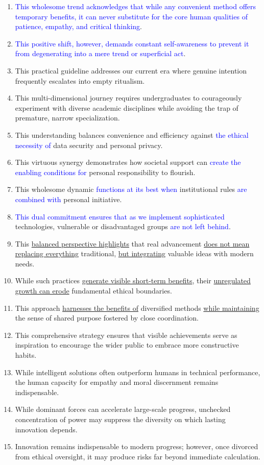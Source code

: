 \begin{enumerate}
    \item \textcolor{blue}{This wholesome trend acknowledges that while any convenient method offers temporary benefits, it can never substitute for the core human qualities of patience, empathy, and critical thinking}.
    \item \textcolor{blue}{This positive shift, however, demands constant self-awareness to prevent it from degenerating into a mere trend or superficial act}.
    \item This practical guideline addresses our current era where genuine intention frequently escalates into empty ritualism.
    \item This multi-dimensional journey requires undergraduates to courageously experiment with diverse academic disciplines while avoiding the trap of premature, narrow specialization.
    \item This understanding balances convenience and efficiency against \textcolor{blue}{the ethical necessity of} data security and personal privacy.
    \item This virtuous synergy demonstrates how societal support can \textcolor{blue}{create the enabling conditions for} personal responsibility to flourish.
    \item This wholesome dynamic \textcolor{blue}{functions at its best when} institutional rules \textcolor{blue}{are combined with} personal initiative.
    \item \textcolor{blue}{This dual commitment ensures that as we implement sophisticated} technologies, vulnerable or disadvantaged groups \textcolor{blue}{are not left behind}.
    \item This \underline{balanced perspective highlights} that real advancement \underline{does not mean replacing everything} traditional, \underline{but integrating} valuable ideas with modern needs.
    \item While such practices \underline{generate visible short-term benefits}, their \underline{unregulated growth can erode} fundamental ethical boundaries.
    \item This approach \underline{harnesses the benefits of} diversified methods \underline{while maintaining} the sense of shared purpose fostered by close coordination.
    \item This comprehensive strategy ensures that visible achievements serve as inspiration to encourage the wider public to embrace more constructive habits.
    \item While intelligent solutions often outperform humans in technical performance, the human capacity for empathy and moral discernment remains indispensable.
    \item While dominant forces can accelerate large-scale progress, unchecked concentration of power may suppress the diversity on which lasting innovation depends.
    \item Innovation remains indispensable to modern progress; however, once divorced from ethical oversight, it may produce risks far beyond immediate calculation.
\end{enumerate}

